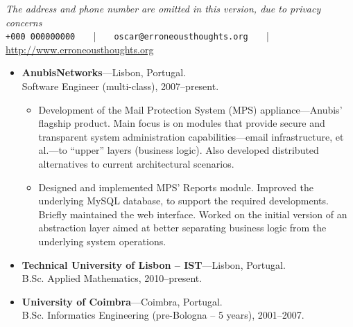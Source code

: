 \documentclass{article}
\newenvironment{topic}[1]
   {{\noindent\large\bfseries\raisebox{0pt}[\height][1ex]{#1}\hrule}%
    \begin{list}{}{%
       \setlength{\leftmargin}{.25cm}}%
    \item[]}
   {\end{list}\medskip}
\newenvironment{header}[1]
   {\centering{\noindent\large\bfseries\raisebox{0pt}[\height][1ex]{\LARGE\bfseries #1}\hrule}%
    \begin{center}}
   {\end{center}\medskip}
\begin{document}
\begin{header}
{Óscar Francisco Godinho Pereira} 
{\emph{The address and phone number are omitted in this version, due to privacy concerns}}\smallskip\\
\texttt{+000 000000000} \verb+   +|\verb+   + \texttt{oscar@erroneousthoughts.org} \verb+   +|\verb+   + \url{http://www.erroneousthoughts.org} 
\end{header}

\begin{topic}{Professional Experience}
\begin{itemize}
\item {\bfseries AnubisNetworks}---Lisbon, Portugal.\\
  Software Engineer (multi-class), 2007--present.
	\begin{itemize}
		\item Development of the Mail Protection System\textsuperscript{\texttrademark} (MPS)
appliance---Anubis' flagship product. Main focus is on modules that provide secure and transparent system administration capabilities---email
infrastructure, et al.---to ``upper'' layers (business logic). Also developed distributed alternatives to current architectural scenarios.
		\item Designed and implemented MPS' Reports module. Improved the underlying MySQL database, to support the required developments. Briefly maintained the web interface. Worked on the initial version of an abstraction layer aimed at better separating business logic from the underlying system operations.
\end{itemize}
\end{itemize}
\end{topic}

\begin{topic}{Formal Education}

\begin{itemize}
\item {\bfseries Technical University of Lisbon -- IST}---Lisbon, Portugal.\\
  B.Sc. Applied Mathematics, 2010--present.
\item {\bfseries University of Coimbra}---Coimbra, Portugal.\\
  B.Sc. Informatics Engineering (pre-Bologna -- 5 years), 2001--2007.
\end{itemize}
\end{topic}
\end{document}
